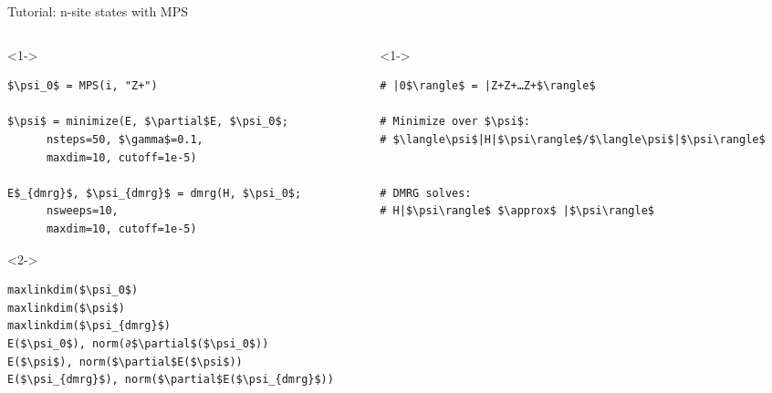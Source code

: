 \begin{frame}[fragile]{Tutorial: n-site states with MPS}


\begin{columns}

\begin{column}{5cm}

\begin{onlyenv}<1->

\begin{lstlisting}[language=JuliaLocal, style=julia, mathescape, basicstyle=\small]
$\psi_0$ = MPS(i, "Z+")

$\psi$ = minimize(E, $\partial$E, $\psi_0$;
      nsteps=50, $\gamma$=0.1,
      maxdim=10, cutoff=1e-5)

E$_{dmrg}$, $\psi_{dmrg}$ = dmrg(H, $\psi_0$;
      nsweeps=10,
      maxdim=10, cutoff=1e-5)
\end{lstlisting}

\end{onlyenv}

\begin{onlyenv}<2->

\begin{lstlisting}[language=JuliaLocal, style=julia, mathescape, basicstyle=\small]
maxlinkdim($\psi_0$)
maxlinkdim($\psi$)
maxlinkdim($\psi_{dmrg}$)
E($\psi_0$), norm(∂$\partial$($\psi_0$))
E($\psi$), norm($\partial$E($\psi$))
E($\psi_{dmrg}$), norm($\partial$E($\psi_{dmrg}$))
\end{lstlisting}

\end{onlyenv}

\end{column}

\begin{column}{5.5cm}

\begin{onlyenv}<1->

\begin{lstlisting}[style=julia, numbers=none, mathescape, basicstyle=\small]
# |0$\rangle$ = |Z+Z+…Z+$\rangle$

# Minimize over $\psi$:
# $\langle\psi$|H|$\psi\rangle$/$\langle\psi$|$\psi\rangle$


# DMRG solves:
# H|$\psi\rangle$ $\approx$ |$\psi\rangle$
 \end{lstlisting}

\end{onlyenv}


\end{column}
\end{columns}
\end{frame}
